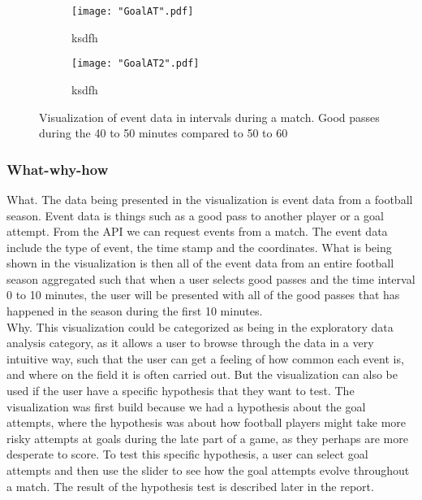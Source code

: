 \documentclass[Report.tex]{subfiles}
\begin{document}
\begin{figure}
\center
\begin{subfigure}[b]{0.7\linewidth}
\texttt{[image: "GoalAT".pdf]}
\caption{ksdfh}
\end{subfigure}
\begin{subfigure}[b]{0.7\textwidth}
\texttt{[image: "GoalAT2".pdf]}
\caption{ksdfh}
\end{subfigure}


\caption{Visualization of event data in intervals during a match. Good passes during the 40 to 50 minutes compared to 50 to 60}



\label{Fig:Events}
\end{figure}

\subsubsection{What-why-how}
What. The data being presented in the visualization is event data from a football season. Event data is things such as a good pass to another player or a goal attempt. From the API we can request events from a match. The event data include the type of event, the time stamp and the coordinates. What is being shown in the visualization is then all of the event data from an entire football season aggregated such that when a user selects good passes and the time interval 0 to 10 minutes, the user will be presented with all of the good passes that has happened in the season during the first 10 minutes.\\

\noindent Why. This visualization could be categorized as being in the exploratory data analysis category, as it allows a user to browse through the data in a very intuitive way, such that the user can get a feeling of how common each event is, and where on the field it is often carried out. But the visualization can also be used if the user have a specific hypothesis that they want to test. The visualization was first build because we had a hypothesis about the goal attempts, where the hypothesis was about how football players might take more risky attempts at goals during the late part of a game, as they perhaps are more desperate to score. To test this specific hypothesis, a user can select goal attempts and then use the slider to see how the goal attempts evolve throughout a match. The result of the hypothesis test is described later in the report.\\
\end{document}
